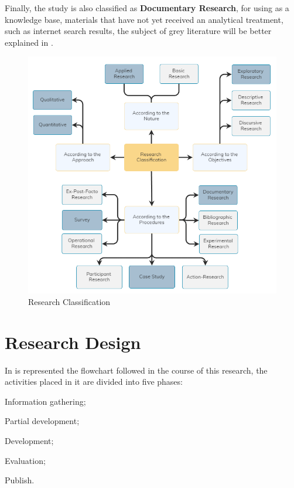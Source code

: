 
Finally, the study is also classified as \textbf{Documentary Research}, for using as a knowledge base, materials that have not yet received an analytical treatment, such as internet search results, the subject of grey literature will be better explained in .

\begin{figure}[!htb]
  \caption{Research Classification}
  \label{fig:research-classification}
  \begin{center}
    \includegraphics[width=14cm]{img/pesquisaSurvey.png}
  \end{center}
\end{figure}

\section{Research Design}\label{sec:met-design}

In  is represented the flowchart followed in the course of this research, the activities placed in it are divided into five phases:
\begin{inparaenum}[(1)]
  \item Information gathering;
  \item Partial development;
  \item Development;
  \item Evaluation;
  \item Publish.
\end{inparaenum}

